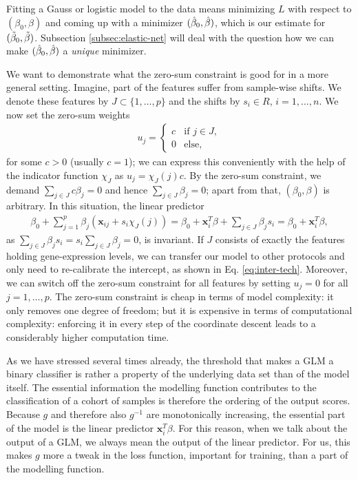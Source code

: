 Fitting a Gauss or logistic model to the data means minimizing $L$ with respect to 
$(\beta_0, \beta)$ and coming up with a minimizer $(\hat{\beta}_0, \hat{\beta})$, which is our estimate for 
$(\tilde{\beta}_0, \tilde{\beta})$. Subsection \ref{subsec:elastic-net} will deal with the question how we can 
make $(\hat{\beta}_0, \hat{\beta})$ a \textit{unique} minimizer.

We want to demonstrate what the zero-sum constraint is good for in a more general setting. Imagine, 
part of the features suffer from sample-wise 
shifts. We denote these features by $J \subset \{1, \ldots, p\}$ and the shifts by $s_i \in R$, 
$i = 1, \ldots, n$. We now set the zero-sum 
weights  
\begin{align}
    u_j =
    \begin{cases}
        c & \text{if } j \in J, \\
        0 & \text{else},
    \end{cases}
\end{align}
for some $c > 0$ (usually $c = 1$); we can express this conveniently with the help of the indicator 
function $\chi_J$ as $u_j = \chi_J(j) c$. By the zero-sum constraint, we demand 
$\sum_{j \in J} c \beta_j = 0$  
and hence $\sum_{j \in J} \beta_j = 0$; apart from that, $(\beta_0, \beta)$ is arbitrary. 
In this situation, the linear predictor 
\begin{align}\label{eq:zerosum-sample-shifts}
    \beta_0 + \sum_{j=1}^p \beta_j (\mathbf{x}_{ij} + s_i \chi_J(j))
    = \beta_0 + \mathbf{x}_i^T \beta + \sum_{j \in J} \beta_j s_i = \beta_0 + \mathbf{x}_i^T \beta,
\end{align}
as $\sum_{j \in J} \beta_j s_i = s_i \sum_{j \in J} \beta_j = 0$, is invariant. If $J$ consists of 
exactly the features holding gene-expression levels, we can transfer our model to other protocols 
and only need to re-calibrate the intercept, as shown in Eq. \eqref{eq:inter-tech}. Moreover, we 
can switch off the zero-sum constraint for all features by setting $u_j = 0$ for all 
$j = 1, \ldots, p$. The zero-sum constraint is cheap in terms of model complexity: it only removes 
one degree of freedom; but it is expensive in terms of computational complexity: enforcing it in
every step of the coordinate descent leads to a considerably higher computation time. 

As we have stressed several times already, the threshold that makes a GLM a binary classifier 
is rather a property of the underlying data set than of the model itself. The essential information 
the modelling function contributes to the classification of a cohort of samples is therefore the 
ordering of the output scores. Because $g$ and therefore also $g^{-1}$ are monotonically increasing, 
the essential part of the model is the linear predictor $\mathbf{x}_i^T \beta$. For this reason, when we 
talk about the output of a GLM, we always mean the output of the linear predictor. For us, this 
makes $g$ more a tweak in the loss function, important for training, than a part of the modelling 
function.

